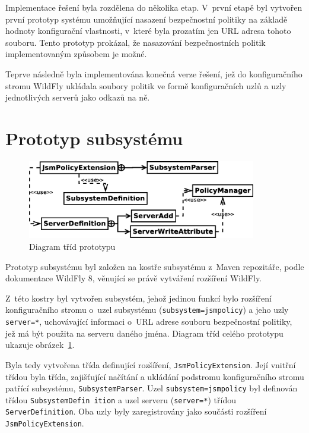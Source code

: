 Implementace řešení byla rozdělena do několika etap. V~první etapě byl vytvořen první prototyp systému umožňující nasazení bezpečnostní politiky na základě hodnoty konfigurační vlastnosti, v~které byla prozatím jen URL adresa tohoto souboru. Tento prototyp prokázal, že nasazování bezpečnostních politik implementovaným způsobem je možné.

Teprve následně byla implementována konečná verze řešení, jež do konfiguračního stromu WildFly ukládala soubory politik ve formě konfiguračních uzlů a uzly jednotlivých serverů jako odkazů na ně.

\section{Prototyp subsystému} \label{prototyp}

\begin{figure}[ht]
  \centering
  \includegraphics[width=10cm]{fig/tridy1}
  \caption{Diagram tříd prototypu}
  \label{tridy1}
\end{figure}

Prototyp subsystému byl založen na kostře subsystému z~Maven repozitáře, podle dokumentace WildFly 8, věnující se právě vytváření rozšíření WildFly.~\cite{WildFlyExtending}

Z~této kostry byl vytvořen subsystém, jehož jedinou funkcí bylo rozšíření konfiguračního stromu o~uzel subsystému ({\tt subsystem=jsmpolicy}) a jeho uzly {\tt server=*}, uchovávající informaci o~URL adrese souboru bezpečnostní politiky, jež má být použita na serveru daného jména. Diagram tříd celého prototypu ukazuje obrázek~\ref{tridy1}.

Byla tedy vytvořena třída definující rozšíření, {\tt JsmPolicyExtension}.
Její vnitřní třídou byla třída, zajišťující načítání a ukládání podstromu konfiguračního stromu patřící subsystému, {\tt SubsystemParser}.
Uzel {\tt subsystem=jsmpolicy} byl definován třídou {\tt SubsystemDefin ition} a uzel serveru ({\tt server=*}) třídou {\tt ServerDefinition}.
Oba uzly byly zaregistrovány jako součásti rozšíření {\tt JsmPolicyExtension}.

